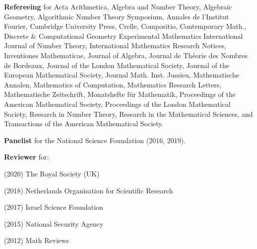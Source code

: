 \documentclass[margin,line]{res}
\newenvironment{list1}{
  \begin{list}{\ding{113}}{%
      \setlength{\itemsep}{0in}
      \setlength{\parsep}{0in} \setlength{\parskip}{0in}
      \setlength{\topsep}{0in} \setlength{\partopsep}{0in}
      \setlength{\leftmargin}{0.17in}}}{\end{list}}
\begin{document}
\begin{resume}
\textbf{Refereeing} for 
Acta Arithmetica,
Algebra and Number Theory, 
Algebraic Geometry,
Algorithmic Number Theory Symposium,  
Annales de l'Institut Fourier,
Cambridge University Press,
Crelle, 
Compositio,
Contemporary Math., 
Discrete \& Computational Geometry
Experimental Mathematics
International Journal of Number Theory, 
International Mathematics Research Notices,
Inventiones Mathematicae, 
Journal of Algebra, 
Journal de  Th\'eorie des Nombres de Bordeaux,
Journal of the London Mathematical Society,
Journal of the European Mathematical Society,
Journal Math. Inst. Jussieu,
Mathematische Annalen,
Mathematics of Computation, 
Mathematics Research Letters, 
Mathematische Zeitschrift, 
Monatshefte für Mathematik,
Proceedings of the American Mathematical Society,
Proceedings of the London Mathematical Society, 
Research in Number Theory, 
Research in the Mathematical Sciences,
and 
Transactions of the American Mathematical Society.


\textbf{Panelist} for the National Science Foundation (2016, 2019).

\vspace{-5pt}
\textbf{Reviewer} for: 
\begin{list1}
\item[] (2020) The Royal Society (UK)
\item[] (2018) Netherlands Organisation for Scientific Research
\item[] (2017) Israel Science Foundation 
\item[] (2015) National Security Agency 
\item[] (2012) Math Reviews
\end{list1}
\vspace{.05in} 



\end{resume}
\end{document}
